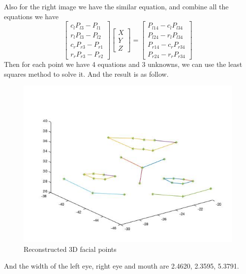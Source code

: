 \documentclass{article}
\begin{document}
Also for the right image we have the similar equation, and combine all the equations we have 
\begin{equation}
\begin{bmatrix}
c_lP_{l3}-P_{l1}\\r_lP_{l3}-P_{l2}\\c_rP_{r3}-P_{r1}\\r_rP_{r3}-P_{r2}
\end{bmatrix}\begin{bmatrix}
X\\Y\\Z
\end{bmatrix}=\begin{bmatrix}
P_{l14}-c_lP_{l34}\\P_{l24}-r_lP_{l34}\\P_{r14}-c_rP_{r34}\\P_{r24}-r_rP_{r34}
\end{bmatrix}
\end{equation}
Then for each point we have 4 equations and 3 unknowns, we can use the least squares method to solve it. And the result is as follow.
\begin{figure}[H]
\centering
\includegraphics[scale=0.55]{face.jpg}
\caption{Reconstructed 3D facial points}
\label{fig:label}
\end{figure}
And the width of the left eye, right eye and mouth are 2.4620, 2.3595, 5.3791.
\end{document}
